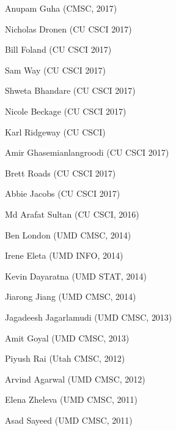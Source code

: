 {{\begin{enumerate*}
\item Anupam Guha (CMSC, 2017)
\item Nicholas Dronen (CU CSCI 2017)
\item Bill Foland (CU CSCI 2017)
\item Sam Way (CU CSCI 2017)
\item Shweta Bhandare (CU CSCI 2017)
\item Nicole Beckage (CU CSCI 2017)
\item Karl Ridgeway (CU CSCI)
\item Amir Ghasemianlangroodi (CU CSCI 2017)
\item Brett Roads (CU CSCI 2017)
\item Abbie Jacobs (CU CSCI 2017)
\item Md Arafat Sultan (CU CSCI, 2016)
\item Ben London (UMD CMSC, 2014)
\item Irene Eleta (UMD INFO, 2014)
\item Kevin Dayaratna (UMD STAT, 2014)
\item Jiarong Jiang (UMD CMSC, 2014)
\item Jagadeesh Jagarlamudi (UMD CMSC, 2013)
\item Amit Goyal (UMD CMSC, 2013)
\item Piyush Rai (Utah CMSC, 2012)
\item Arvind Agarwal (UMD CMSC, 2012)
\item Elena Zheleva (UMD CMSC, 2011)
\item Asad Sayeed (UMD CMSC, 2011)
\end{enumerate*}
}
}




